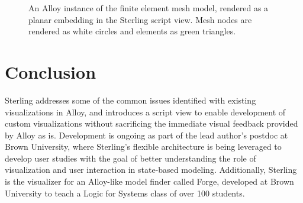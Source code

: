\documentclass[runningheads]{llncs}
\begin{document}
\begin{figure}
    \centering
    \caption{An Alloy instance of the finite element mesh model, rendered as a planar embedding in the Sterling script view. Mesh nodes are rendered as white circles and elements as green triangles.}
    \label{fig:script}
\end{figure}


\section{Conclusion}
\label{conclusions}
Sterling addresses some of the common issues identified with existing visualizations in Alloy, and introduces a script view to enable development of custom visualizations without sacrificing the immediate visual feedback provided by Alloy as is.
Development is ongoing as part of the lead author's postdoc at Brown University, where Sterling's flexible architecture is being leveraged to develop user studies with the goal of better understanding the role of visualization and user interaction in state-based modeling. 
Additionally, Sterling is the visualizer for an Alloy-like model finder called Forge, developed at Brown University to teach a Logic for Systems class of over 100 students.
\end{document}
